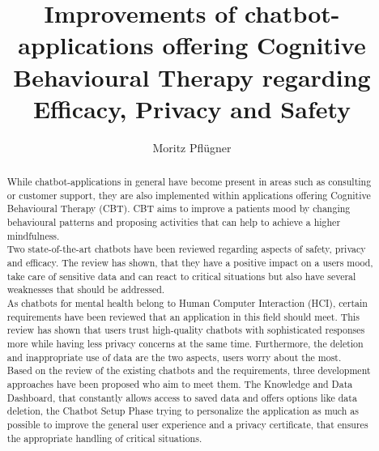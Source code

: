 \documentclass[sigconf, nonacm]{acmart}
\begin{document}
\graphicspath{ {./images/} }

\title{Improvements of chatbot-applications offering Cognitive Behavioural Therapy regarding Efficacy, Privacy and Safety}

\author{Moritz Pflügner}


\begin{abstract}
While chatbot-applications in general have become present in areas such as consulting or customer support, they are also implemented
within applications offering Cognitive Behavioural Therapy (CBT). CBT aims to improve a patients mood by changing behavioural patterns and proposing
activities that can help to achieve a higher mindfulness.
\\
Two state-of-the-art chatbots have been reviewed regarding aspects of safety, privacy and efficacy. The review has shown, that they have a positive 
impact on a users mood, take care of sensitive data and can react to critical situations but also have several weaknesses that should be addressed.
\\
As chatbots for mental health belong to Human Computer Interaction (HCI), certain requirements have been reviewed that an application in this field should meet. This review has shown
that users trust high-quality chatbots with sophisticated responses more while having less privacy concerns at the same time. Furthermore, the deletion and 
inappropriate use of data are the two aspects, users worry about the most. 
\\
Based on the review of the existing chatbots and the requirements, three development approaches have been proposed who aim to meet them.
The Knowledge and Data Dashboard, that constantly allows access to saved data and offers options like data deletion, 
the Chatbot Setup Phase trying to personalize the application as much as possible to improve the general user experience and 
a privacy certificate, that ensures the appropriate handling of critical situations.   
\end{abstract}
\end{document}
